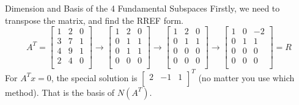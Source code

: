 \documentclass{beamer}
\begin{document}
\begin{frame}{Dimension and Basis of the 4 Fundamental Subspaces}
Firstly, we need to transpose the matrix, and find the RREF form.
    \begin{equation*}
        A^T=\left[ \begin{matrix}
            1&		2&		0\\
            3&		7&		1\\
            4&		9&		1\\
            2&		4&		0\\
        \end{matrix} \right] \rightarrow \left[ \begin{matrix}
            1&		2&		0\\
            0&		1&		1\\
            0&		1&		1\\
            0&		0&		0\\
        \end{matrix} \right] \rightarrow \left[ \begin{matrix}
            1&		2&		0\\
            0&		1&		1\\
            0&		0&		0\\
            0&		0&		0\\
        \end{matrix} \right] \rightarrow \left[ \begin{matrix}
            1&		0&		-2\\
            0&		1&		1\\
            0&		0&		0\\
            0&		0&		0\\
        \end{matrix} \right] =R
    \end{equation*}
For $A^Tx=0$, the special solution is $\left[ \begin{matrix}
	2&		-1&		1\\
\end{matrix} \right] ^T$ (no matter you use which method). That is the basis of $N(A^T)$.
\end{frame}
\end{document}
